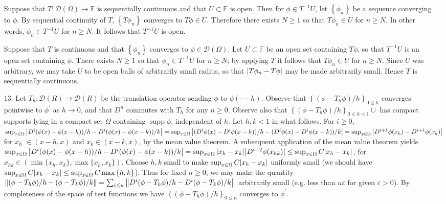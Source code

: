 \documentclass[11pt,leqno]{article}
\theoremstyle{plain}
\theoremstyle{definition}
\numberwithin{equation}{section}
\numberwithin{lem}{section}
\newcommand{\cbr}[1]{\left\{#1\right\}}
\DeclareMathOperator{\supp}{supp}
\begin{document}
\begin{enumerate}
    Suppose that $T\colon \mathcal D(\Omega)\to\mathbb F$ is sequentially continuous and that $U\subset \mathbb F$ is open. Then for $\phi\in T^{-1}U$, let $\cbr{\phi_n}$ be a sequence converging to $\phi$. By sequential continuity of $T$, $\cbr{T\phi_n}$ converges to $T\phi\in U$. Therefore there exists $N\geq 1$ so that $T\phi_n\in U$ for $n\geq N$. In other words, $\phi_n\in T^{-1}U$ for $n\geq N$. It follows that $T^{-1}U$ is open.

    Suppose that $T$ is continuous and that $\cbr{\phi_n}$ converges to $\phi\in\mathcal D(\Omega)$. Let $U\subset \mathbb F$ be an open set containing $T\phi$, so that $T^{-1}U$ is an open set containing $\phi$. There exists $N\geq 1$ so that $\phi_n\in T^{-1}U$ for $n\geq N$; by applying $T$ it follows that $T\phi_n\in U$ for $n\geq N$. Since $U$ was arbitrary, we may take $U$ to be open balls of arbitrarily small radius, so that $\abs{T\phi_n - T\phi}$ may be made arbitrarily small. Hence $T$ is sequentially continuous.
    \item[13.] Let $T_h\colon \mathcal D(R)\to\mathcal D(R)$ be the translation operator sending $\phi$ to $\phi(\cdot-h)$. Observe that $\cbr{(\phi-T_h\phi)/h}_{0\leq h}$ converges pointwise to $\phi^\prime$ as $h\to 0$, and that $D^n$ commutes with $T_h$ for any $n\geq 0$. Observe also that $\cbr{(\phi-T_h\phi)/h}_{0\leq h<1}\cup $ has compact supports lying in a compact set $\Omega$ containing $\supp \phi$, independent of $h$. Let $h,k<1$ in what follows. For $i\geq 0$, $\sup_{x\in \Omega}\abs{D^i(\phi(x)-\phi(x-h))/h -D^i(\phi(x)-\phi(x-k))/k} = \sup_{x\in \Omega}\abs{(D^i\phi(x)-D^i\phi(x-h))/h -(D^i\phi(x)-D^i\phi(x-k))/k} = \sup_{x\in \Omega}\abs{D^{i+1}\phi(x_h) -D^{i+1}\phi(x_k)}$ for $x_h$ $\in (x-h,x)$ and $x_k\in (x-k,x)$, by the mean value theorem. A subsequent application of the mean value theorem yields $\sup_{x\in \Omega}\abs{D^i(\phi(x)-\phi(x-h))/h -D^i(\phi(x)-\phi(x-k))/k} = \sup_{x\in \Omega}\abs{x_h-x_k}\abs{D^{i+2}\phi(x_{hk})} \leq \sup_{x\in \Omega}C\abs{x_h-x_k}$, for $x_{hk}\in (\min\{x_h,x_k\},\max\{x_h,x_k\})$. Choose $h,k$ small to make $\sup_{x\in \Omega}C\abs{x_h-x_k}$ uniformly small (we should have $\sup_{x\in \Omega}C\abs{x_h-x_k}\leq \sup_{x\in \Omega}C\max\cbr{h,k}$). Thus for fixed $n\geq 0$, we may make the quantity $\norm{(\phi-T_h\phi)/h - (\phi-T_k\phi)/k} = \sum_{i\leq n}\norm{D^i(\phi-T_h\phi)/h - D^i(\phi-T_k\phi)/k}$ arbitrarily small (e.g. less than $n\varepsilon$ for given $\varepsilon>0$). By completeness of the space of test functions we have $\cbr{(\phi-T_h\phi)/h}_{0\leq h}$ converges to $\phi^\prime$.
\end{enumerate}
\end{document}
